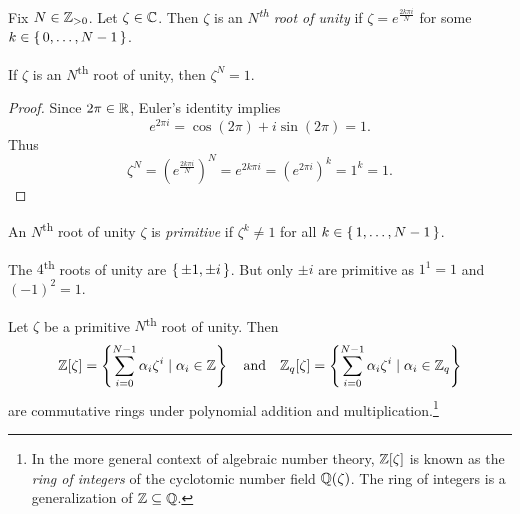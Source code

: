 \documentclass[10pt,reqno]{article}
\begin{document}
\begin{definition}\label{def:nthrootofunity}
    Fix $N \in \mathbb{Z}_{>0}$. Let $\zeta \in \mathbb{C}$. Then $\zeta$ is an \emph{$N$\textsuperscript{th} root of unity} if $\zeta=e^{\frac{2k \pi i}{N}}$ for some $k \in \set{0,\ldots, N-1}$. 
\end{definition}


\begin{proposition}\label{prop:nthrootofunity}
    If $\zeta$ is an $N$\textsuperscript{th} root of unity, then $\zeta^N=1$.
\end{proposition}
\begin{proof}
    Since $2\pi \in \mathbb{R}$, Euler's identity implies 
    \[e^{2\pi i} = \cos(2 \pi) +i \sin(2\pi)=1.\]
    Thus
    \[\zeta ^N = \left( e^{\frac{2k \pi i}{N}} \right)^N =e^{2k \pi i}=\left(e^{2\pi i}\right)^k=1^k=1.\]
\end{proof}

\begin{definition}\label{def:primitive}
An $N$\textsuperscript{th} root of unity $\zeta$ is \emph{primitive} if $\zeta^k \neq 1$ for all $k \in \set{1,\ldots,N-1}$. 
\end{definition}


\begin{example*}\label{ex:4throotofunity}
The $4$\textsuperscript{th} roots of unity are $\set{\pm{1},\pm{i}}$. But only $\pm{i}$ are primitive as $1^1=1$ and $(-1)^2=1$.
\end{example*}


\begin{proposition}\label{prop:cycpolyring}
Let $\zeta$ be a primitive $N$\textsuperscript{th} root of unity. Then  
    \[\mathbb{Z}[\zeta] = \left\{ \sum_{i=0}^{N-1} \alpha_i \zeta^i \mid \alpha_i \in \mathbb{Z} \right\} \quad \textnormal{and} \quad \mathbb{Z}_q[\zeta] = \left\{ \sum_{i=0}^{N-1} \alpha_i \zeta^i \mid \alpha_i \in \mathbb{Z}_q \right\} \]
are commutative rings under polynomial addition and multiplication.\footnote{In the more general context of algebraic number theory, $\mathbb{Z}[\zeta]$ is known as the \emph{ring of integers} of the cyclotomic number field $\mathbb{Q}(\zeta)$. The ring of integers is a generalization of $\mathbb{Z} \subseteq \mathbb{Q}$.}
\end{proposition}

\begin{comment}
\begin{remark*}
    Note that whenever we perform polynomial multiplication in $\Z[\zeta]$ or $\Z_q[\zeta]$, and $\zeta^N$ appears in the product, we can apply the relation $\zeta^N=1$.
\end{remark*}
\end{comment}
\end{document}
